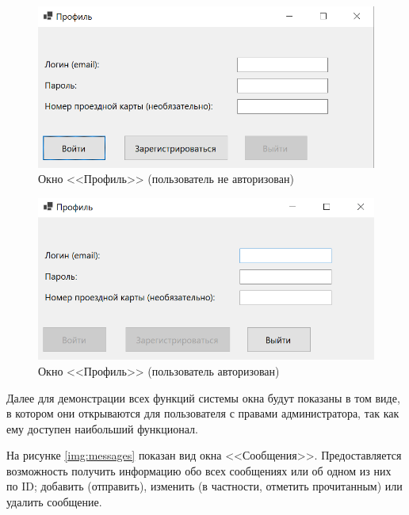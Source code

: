 \begin{figure}[h!]
	\begin{center}
		\includegraphics[scale=1]{../imgs/int/profu.png}
	\end{center}
	\captionsetup{justification=centering}
	\caption{Окно <<Профиль>> (пользователь не авторизован)}
	\label{img:profu}
\end{figure}

\clearpage
\begin{figure}[h!]
	\begin{center}
		\includegraphics[scale=1]{../imgs/int/profa.png}
	\end{center}
	\captionsetup{justification=centering}
	\caption{Окно <<Профиль>> (пользователь авторизован)}
	\label{img:profa}
\end{figure}

Далее для демонстрации всех функций системы окна будут показаны в том виде, в котором они открываются для пользователя с правами администратора, так как ему доступен наибольший функционал.

На рисунке \ref{img:messages} показан вид окна <<Сообщения>>. Предоставляется возможность получить информацию обо всех сообщениях или об одном из них по ID; добавить (отправить), изменить (в частности, отметить прочитанным) или удалить сообщение.

